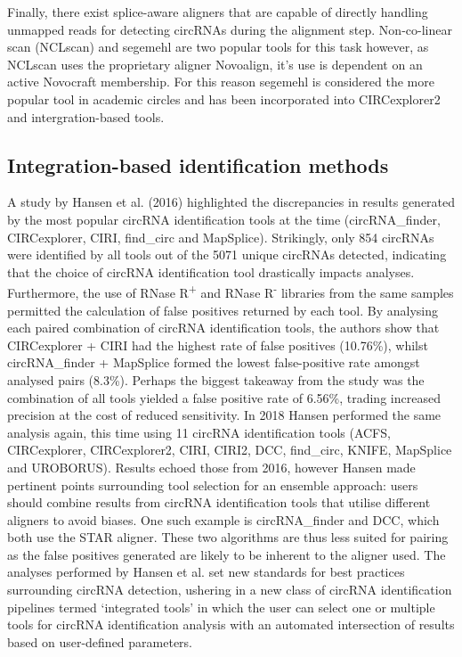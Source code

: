 \documentclass[journal,review,submit,pdftex,moreauthors]{Definitions/mdpi}
\begin{document}
Finally, there exist splice-aware aligners that are capable of directly handling unmapped reads for detecting circRNAs during the alignment step. Non-co-linear scan (NCLscan) \cite{NCLscan} and segemehl \cite{segemehl} are two popular tools for this task however, as NCLscan uses the proprietary aligner Novoalign, it's use is dependent on an active Novocraft membership. For this reason segemehl is considered the more popular tool in academic circles and has been incorporated into CIRCexplorer2 and intergration-based tools. 

\subsection{Integration-based identification methods}
A study by Hansen et al. (2016) \cite{Hansen2016Apr} highlighted the discrepancies in results generated by the most popular circRNA identification tools at the time (circRNA\_finder, CIRCexplorer, CIRI, find\_circ and MapSplice). Strikingly, only 854 circRNAs were identified by all tools out of the 5071 unique circRNAs detected, indicating that the choice of circRNA identification tool drastically impacts analyses. Furthermore, the use of RNase R\textsuperscript{+} and RNase R\textsuperscript{-} libraries from the same samples permitted the calculation of false positives returned by each tool. By analysing each paired combination of circRNA identification tools, the authors show that CIRCexplorer + CIRI had the highest rate of false positives (10.76\%), whilst circRNA\_finder + MapSplice formed the lowest false-positive rate amongst analysed pairs (8.3\%). Perhaps the biggest takeaway from the study was the combination of all tools yielded a false positive rate of 6.56\%, trading increased precision at the cost of reduced sensitivity. In 2018 Hansen \cite{Hansen2018} performed the same analysis again, this time using 11 circRNA identification tools (ACFS, CIRCexplorer, CIRCexplorer2, CIRI, CIRI2, DCC, find\_circ, KNIFE, MapSplice and UROBORUS). Results echoed those from 2016, however Hansen made pertinent points surrounding tool selection for an ensemble approach: users should combine results from circRNA identification tools that utilise different aligners to avoid biases. One such example is circRNA\_finder and DCC, which both use the STAR aligner. These two algorithms are thus less suited for pairing as the false positives generated are likely to be inherent to the aligner used. The analyses performed by Hansen et al. set new standards for best practices surrounding circRNA detection, ushering in a new class of circRNA identification pipelines termed `integrated tools' in which the user can select one or multiple tools for circRNA identification analysis with an automated intersection of results based on user-defined parameters. \par
\end{document}
